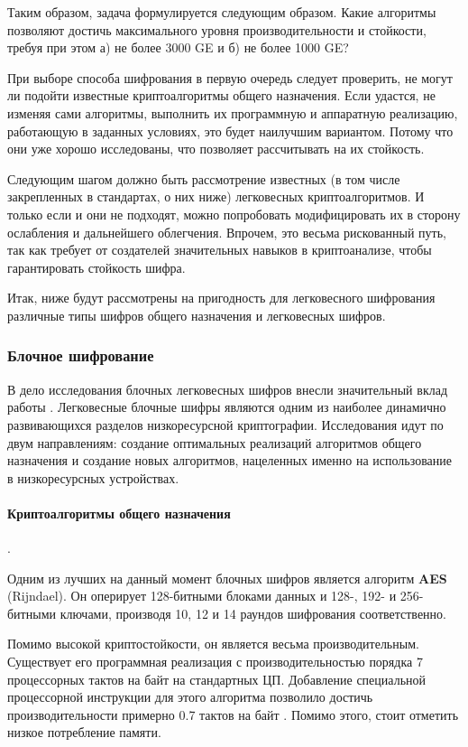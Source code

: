 Таким образом, задача формулируется следующим образом. Какие алгоритмы позволяют достичь максимального уровня производительности и стойкости, требуя при этом а) не более 3000 GE и б) не более 1000 GE?

При выборе способа шифрования в первую очередь следует проверить, не могут ли подойти известные криптоалгоритмы общего назначения. Если удастся, не изменяя сами алгоритмы, выполнить их программную и аппаратную реализацию, работающую в заданных условиях, это будет наилучшим вариантом. Потому что они уже хорошо исследованы, что позволяет рассчитывать на их стойкость.

Следующим шагом должно быть рассмотрение известных (в том числе закрепленных в стандартах, о них ниже) легковесных криптоалгоритмов. И только если и они не подходят, можно попробовать модифицировать их в сторону ослабления и дальнейшего облегчения. Впрочем, это весьма рискованный путь, так как требует от создателей значительных навыков в криптоанализе, чтобы гарантировать стойкость шифра.

Итак, ниже будут рассмотрены на пригодность для легковесного шифрования различные типы шифров общего назначения и легковесных шифров.

\subsubsection{Блочное шифрование}

В дело исследования блочных легковесных шифров внесли значительный вклад работы \cite{src30} \cite{src27}. Легковесные блочные шифры являются одним из наиболее динамично развивающихся разделов низкоресурсной криптографии. Исследования идут по двум направлениям: создание оптимальных реализаций алгоритмов общего назначения и создание новых алгоритмов, нацеленных именно на использование в низкоресурсных устройствах.

\paragraph{Криптоалгоритмы общего назначения}. \newline

Одним из лучших на данный момент блочных шифров является алгоритм \textbf{AES} (Rijndael). Он оперирует 128-битными блоками данных и 128-, 192- и 256-битными ключами, производя 10, 12 и 14 раундов шифрования соответственно.

Помимо высокой криптостойкости, он является весьма производительным. Существует его программная реализация с производительностью порядка 7 процессорных тактов на байт \cite{src31} на стандартных ЦП. Добавление специальной процессорной инструкции для этого алгоритма позволило достичь производительности примерно 0.7 тактов на байт \cite{src32}.  Помимо этого, стоит отметить низкое потребление памяти.

